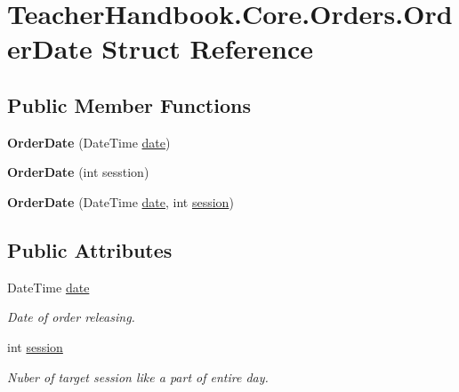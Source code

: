 \hypertarget{struct_teacher_handbook_1_1_core_1_1_orders_1_1_order_date}{}\section{Teacher\+Handbook.\+Core.\+Orders.\+Order\+Date Struct Reference}
\label{struct_teacher_handbook_1_1_core_1_1_orders_1_1_order_date}
\subsection*{Public Member Functions}
\begin{DoxyCompactItemize}
\item 
\mbox{\label{struct_teacher_handbook_1_1_core_1_1_orders_1_1_order_date_aac5b3b22d59609f730f6322ab2a69466}} 
{\bfseries Order\+Date} (Date\+Time \mbox{\hyperlink{struct_teacher_handbook_1_1_core_1_1_orders_1_1_order_date_a1226c72747de3c0dcf67cad21a0261bf}{date}})
\item 
\mbox{\label{struct_teacher_handbook_1_1_core_1_1_orders_1_1_order_date_a5b30e6f8125cdd22751b9ca6e0f20c78}} 
{\bfseries Order\+Date} (int sesstion)
\item 
\mbox{\label{struct_teacher_handbook_1_1_core_1_1_orders_1_1_order_date_a4d44c669df78e31841a03a16aaa0da3d}} 
{\bfseries Order\+Date} (Date\+Time \mbox{\hyperlink{struct_teacher_handbook_1_1_core_1_1_orders_1_1_order_date_a1226c72747de3c0dcf67cad21a0261bf}{date}}, int \mbox{\hyperlink{struct_teacher_handbook_1_1_core_1_1_orders_1_1_order_date_a8ffd98cdee8fc98d2eb79af227084dd1}{session}})
\end{DoxyCompactItemize}
\subsection*{Public Attributes}
\begin{DoxyCompactItemize}
\item 
Date\+Time \mbox{\hyperlink{struct_teacher_handbook_1_1_core_1_1_orders_1_1_order_date_a1226c72747de3c0dcf67cad21a0261bf}{date}}
\begin{DoxyCompactList}\small\item\em Date of order releasing. \end{DoxyCompactList}\item 
int \mbox{\hyperlink{struct_teacher_handbook_1_1_core_1_1_orders_1_1_order_date_a8ffd98cdee8fc98d2eb79af227084dd1}{session}}
\begin{DoxyCompactList}\small\item\em Nuber of target session like a part of entire day. \end{DoxyCompactList}\end{DoxyCompactItemize}


